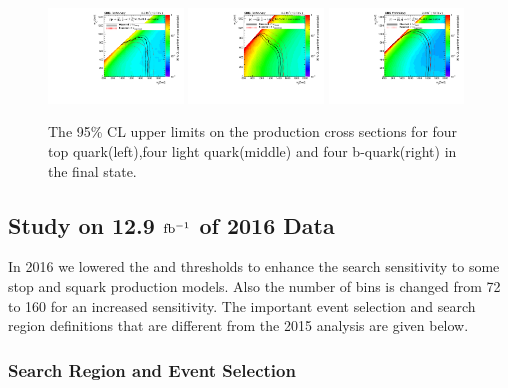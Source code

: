 \begin{figure}[h]
\centering
\includegraphics[width=0.32\textwidth]{T1tttt_2p3_limit.pdf}
\includegraphics[width=0.32\textwidth]{T1qqqq_2p3_limit.pdf}
\includegraphics[width=0.32\textwidth]{T1bbbb_2p3_limit.pdf}
\caption{\label{fig:Limit2015}The 95\% CL upper limits on the production cross sections for four top quark(left),four light quark(middle) and four b-quark(right) in the final state. }
\end{figure}

\newpage
\subsection{Study on 12.9 $\rm fb^{-1}$ of 2016 Data}
In 2016 we lowered the \HT and \njets thresholds to enhance the search sensitivity to some stop and squark production models. Also the number of bins is changed from 72 to 160 for an increased sensitivity. The important event selection and search region definitions that are different from the 2015 analysis are given below. 
\subsubsection{Search Region and Event Selection}

